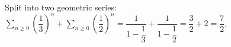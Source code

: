 Split into two geometric series: $\displaystyle\sum_{n\ge0}\left(\dfrac{1}{3}\right)^n+\sum_{n\ge0}\left(\dfrac{1}{2}\right)^n=\dfrac{1}{1-\dfrac{1}{3}}+\dfrac{1}{1-\dfrac{1}{2}}=\dfrac{3}{2}+2=\boxed{\dfrac{7}{2}}$.
